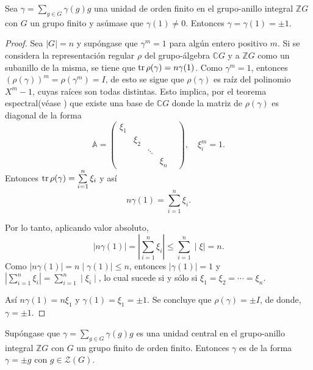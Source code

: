 \begin{lema}\label{lem:BH}
Sea $\gamma = \sum_{g \in G}\gamma(g)g$ una unidad de orden finito en el grupo-anillo integral $\mathds{Z}G$ con $G$ un grupo finito y asúmase que $\gamma(1)\neq 0$. Entonces $\gamma = \gamma(1) = \pm 1.$
\end{lema}
\begin{proof}
Sea $|G| = n$ y supóngase que $\gamma^{m} = 1$ para algún entero positivo $m$. Si se considera la representación regular $\rho$ del grupo-álgebra $\mathds{C}G$ y a $\mathds{Z}G$ como un subanillo de la misma, se tiene que $\operatorname{tr}\rho(\gamma) = n\gamma(1)$.
Como $\gamma^{m} = 1$, entonces $\left( \rho(\gamma) \right)^m = \rho(\gamma^{m}) = I$, de esto se sigue que $\rho(\gamma)$ es raíz del polinomio $X^m-1$, cuyas raíces son todas distintas. Esto implica, por el teorema espectral(véase \cite[p 214]{bib:lang}) que existe una base de $\mathds{C}G$ donde la matriz de $\rho(\gamma)$ es diagonal de la forma
\begin{equation*}
\mathds{A} = \begin{pmatrix}
\xi_1 & & & &\\
 & \xi_2 & & \\
 & & \ddots & \\
  & & & \xi_n
\end{pmatrix}, \quad \xi_i^m = 1.
\end{equation*}
 Entonces $\operatorname{tr}\rho(\gamma) = \sum\limits_{i = 1}^{n}\xi_i$ y así
 \begin{equation*}
 n\gamma(1) = \sum\limits_{i =1}^{n}\xi_i.
 \end{equation*}
 
 Por lo tanto, aplicando valor absoluto,
 \begin{equation*}
 \mid n\gamma(1) \mid = \left| \sum_{i = 1}^{n}\xi_i \right| \leq \sum_{i = 1}^{n}\mid \xi \mid = n.
 \end{equation*}
 Como $\mid n\gamma(1)\mid = n\mid\gamma(1)\mid \leq n$, entonces $\mid \gamma(1) \mid = 1$ y $\left| \sum_{i = 1}^{n}\xi_i \right| = \sum\limits_{i = 1}^{n}\mid \xi_i \mid$, lo cual sucede si y sólo si $\xi_1=\xi_2=\cdots = \xi_n$.
 
 Así $n\gamma(1) = n\xi_1$ y $\gamma(1) = \xi_1=\pm 1$. Se concluye que $\rho(\gamma) = \pm I$, de donde, $\gamma = \pm 1$.
\end{proof}
\begin{corolario}
Supóngase que $\gamma = \sum_{g \in G}\gamma(g)g$ es una unidad central en el grupo-anillo integral $\mathds{Z}G$ con $G$ un grupo finito de orden finito. Entonces $\gamma$ es de la forma $\gamma = \pm g$ con $g \in  \mathcal{Z}(G)$.
\end{corolario}
